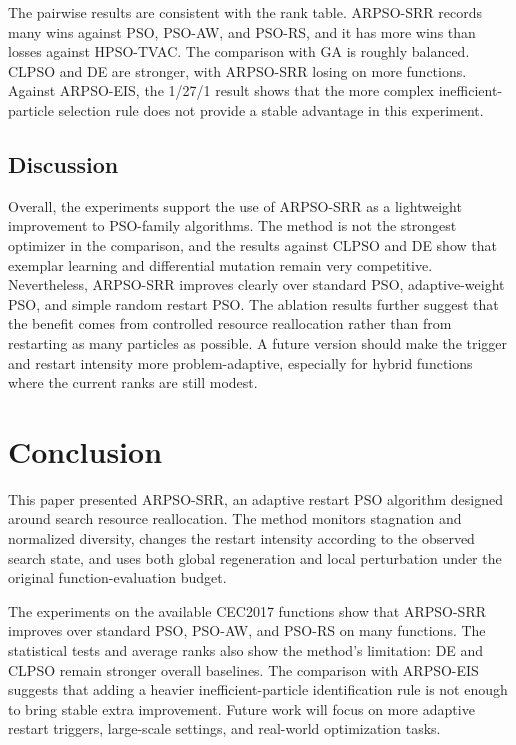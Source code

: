 \documentclass[conference]{IEEEtran}
\begin{document}
The pairwise results are consistent with the rank table. ARPSO-SRR records many wins against PSO, PSO-AW, and PSO-RS, and it has more wins than losses against HPSO-TVAC. The comparison with GA is roughly balanced. CLPSO and DE are stronger, with ARPSO-SRR losing on more functions. Against ARPSO-EIS, the 1/27/1 result shows that the more complex inefficient-particle selection rule does not provide a stable advantage in this experiment.


\subsection{Discussion}
Overall, the experiments support the use of ARPSO-SRR as a lightweight improvement to PSO-family algorithms. The method is not the strongest optimizer in the comparison, and the results against CLPSO and DE show that exemplar learning and differential mutation remain very competitive. Nevertheless, ARPSO-SRR improves clearly over standard PSO, adaptive-weight PSO, and simple random restart PSO. The ablation results further suggest that the benefit comes from controlled resource reallocation rather than from restarting as many particles as possible. A future version should make the trigger and restart intensity more problem-adaptive, especially for hybrid functions where the current ranks are still modest.


\section{Conclusion}\label{sec:conclusion}
This paper presented ARPSO-SRR, an adaptive restart PSO algorithm designed around search resource reallocation. The method monitors stagnation and normalized diversity, changes the restart intensity according to the observed search state, and uses both global regeneration and local perturbation under the original function-evaluation budget.

The experiments on the available CEC2017 functions show that ARPSO-SRR improves over standard PSO, PSO-AW, and PSO-RS on many functions. The statistical tests and average ranks also show the method's limitation: DE and CLPSO remain stronger overall baselines. The comparison with ARPSO-EIS suggests that adding a heavier inefficient-particle identification rule is not enough to bring stable extra improvement. Future work will focus on more adaptive restart triggers, large-scale settings, and real-world optimization tasks.
\end{document}
